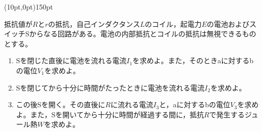 \hakosyokika
\item
    \begin{mawarikomi}(10pt,0pt){150pt}{
        
    }
    抵抗値が$R$\tanni{\Omega }と$r$\tanni{\Omega }の抵抗，自己インダクタンス$L$のコイル，起電力$E$の電池およびスイッチSからなる回路がある。電池の内部抵抗とコイルの抵抗は無視できるものとする。
        \begin{enumerate}
            \item Sを閉じた直後に電池を流れる電流$I_1$を求めよ。また，そのときaに対するbの電位$V_1$を求めよ。
            \item Sを閉じてから十分に時間がたったときに電池を流れる電流$I_2$を求めよ。
            \item この後Sを開く。その直後に$R$に流れる電流$I_3$と，aに対するbの電位$V_3$を求めよ。また，Sを開いてから十分に時間が経過する間に，抵抗$R$で発生するジュール熱$W$を求めよ。
            \end{enumerate}
    \end{mawarikomi}